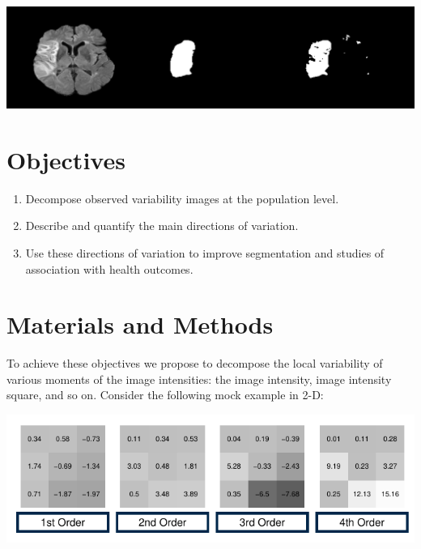 \documentclass[a0,landscape]{a0poster}
\begin{document}
\begin{multicols}{3}
\begin{center}\vspace{.25cm}
\includegraphics[width=1\linewidth]{seg.pdf}
\end{center}\vspace{.5cm}
\large{\section*{\color{uwred}Objectives}}
\begin{enumerate}
\item  Decompose observed variability images at the population level.
\item Describe and quantify the main directions of variation.
\item Use these directions of variation to improve segmentation and studies of association with health outcomes.
\end{enumerate}
\large{\section*{\color{uwred}Materials and Methods}}
\noindent To achieve these objectives we propose to decompose the local variability of various moments of the image intensities: the image intensity, image  intensity square, and so on. Consider the following mock example in 2-D:
\begin{center}\vspace{.25cm}
\includegraphics[width=1\linewidth]{ln_example_higherorder_poset.pdf}

\end{center}
\end{multicols}
\end{document}
